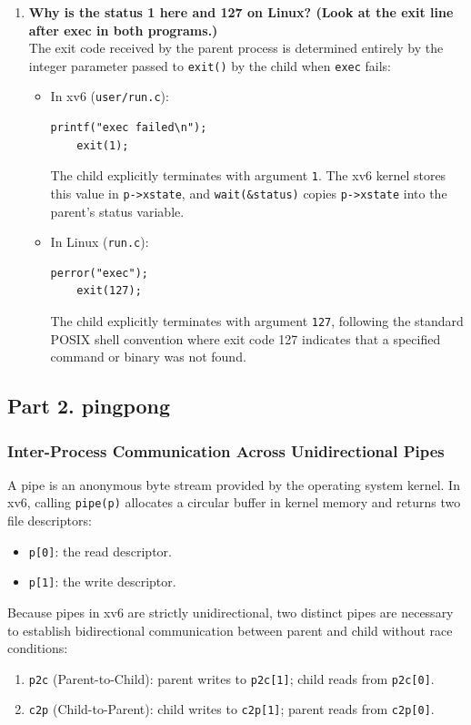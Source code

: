 \documentclass{labreport}
\begin{document}
\begin{enumerate}[leftmargin=*]
    \item \textbf{Why is the status 1 here and 127 on Linux? (Look at the exit line after exec in both programs.)}\\[0.2em]
    The exit code received by the parent process is determined entirely by the integer parameter passed to \texttt{exit()} by the child when \texttt{exec} fails:
    \begin{itemize}
        \item In xv6 (\texttt{user/run.c}):
\begin{lstlisting}[style=c]
    printf("exec failed\n");
    exit(1);
\end{lstlisting}
        The child explicitly terminates with argument \texttt{1}. The xv6 kernel stores this value in \texttt{p->xstate}, and \texttt{wait(\&status)} copies \texttt{p->xstate} into the parent's status variable.
        \item In Linux (\texttt{run.c}):
\begin{lstlisting}[style=c]
    perror("exec");
    exit(127);
\end{lstlisting}
        The child explicitly terminates with argument \texttt{127}, following the standard POSIX shell convention where exit code 127 indicates that a specified command or binary was not found.
    \end{itemize}
\end{enumerate}

\subsection{Part 2. pingpong}

\subsubsection{Inter-Process Communication Across Unidirectional Pipes}
A pipe is an anonymous byte stream provided by the operating system kernel. In xv6, calling \texttt{pipe(p)} allocates a circular buffer in kernel memory and returns two file descriptors:
\begin{itemize}[noitemsep]
    \item \texttt{p[0]}: the read descriptor.
    \item \texttt{p[1]}: the write descriptor.
\end{itemize}

Because pipes in xv6 are strictly unidirectional, two distinct pipes are necessary to establish bidirectional communication between parent and child without race conditions:
\begin{enumerate}[noitemsep]
    \item \texttt{p2c} (Parent-to-Child): parent writes to \texttt{p2c[1]}; child reads from \texttt{p2c[0]}.
    \item \texttt{c2p} (Child-to-Parent): child writes to \texttt{c2p[1]}; parent reads from \texttt{c2p[0]}.
\end{enumerate}
\end{document}
